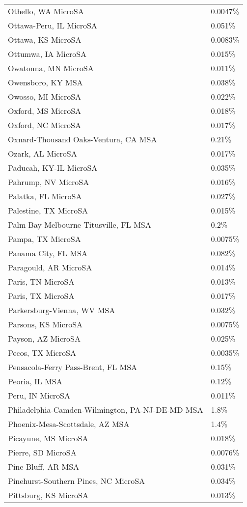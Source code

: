 \begin{longtable}[]{@{}ll@{}}
Othello, WA MicroSA & 0.0047\% \\
Ottawa-Peru, IL MicroSA & 0.051\% \\
Ottawa, KS MicroSA & 0.0083\% \\
Ottumwa, IA MicroSA & 0.015\% \\
Owatonna, MN MicroSA & 0.011\% \\
Owensboro, KY MSA & 0.038\% \\
Owosso, MI MicroSA & 0.022\% \\
Oxford, MS MicroSA & 0.018\% \\
Oxford, NC MicroSA & 0.017\% \\
Oxnard-Thousand Oaks-Ventura, CA MSA & 0.21\% \\
Ozark, AL MicroSA & 0.017\% \\
Paducah, KY-IL MicroSA & 0.035\% \\
Pahrump, NV MicroSA & 0.016\% \\
Palatka, FL MicroSA & 0.027\% \\
Palestine, TX MicroSA & 0.015\% \\
Palm Bay-Melbourne-Titusville, FL MSA & 0.2\% \\
Pampa, TX MicroSA & 0.0075\% \\
Panama City, FL MSA & 0.082\% \\
Paragould, AR MicroSA & 0.014\% \\
Paris, TN MicroSA & 0.013\% \\
Paris, TX MicroSA & 0.017\% \\
Parkersburg-Vienna, WV MSA & 0.032\% \\
Parsons, KS MicroSA & 0.0075\% \\
Payson, AZ MicroSA & 0.025\% \\
Pecos, TX MicroSA & 0.0035\% \\
Pensacola-Ferry Pass-Brent, FL MSA & 0.15\% \\
Peoria, IL MSA & 0.12\% \\
Peru, IN MicroSA & 0.011\% \\
Philadelphia-Camden-Wilmington, PA-NJ-DE-MD MSA & 1.8\% \\
Phoenix-Mesa-Scottsdale, AZ MSA & 1.4\% \\
Picayune, MS MicroSA & 0.018\% \\
Pierre, SD MicroSA & 0.0076\% \\
Pine Bluff, AR MSA & 0.031\% \\
Pinehurst-Southern Pines, NC MicroSA & 0.034\% \\
Pittsburg, KS MicroSA & 0.013\% \\

\end{longtable}
